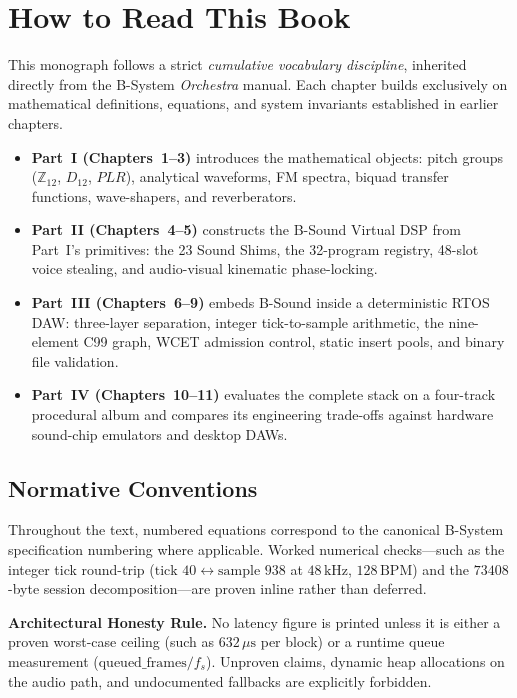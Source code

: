 \chapter{How to Read This Book}

This monograph follows a strict \emph{cumulative vocabulary discipline}, inherited directly from the B-System \emph{Orchestra} manual. Each chapter builds exclusively on mathematical definitions, equations, and system invariants established in earlier chapters.

\begin{itemize}[leftmargin=1.5em]
  \item \textbf{Part~I (Chapters~1--3)} introduces the mathematical objects: pitch groups ($\mathbb{Z}_{12}$, $D_{12}$, $PLR$), analytical waveforms, FM spectra, biquad transfer functions, wave-shapers, and reverberators.
  \item \textbf{Part~II (Chapters~4--5)} constructs the B-Sound Virtual DSP from Part~I's primitives: the 23 Sound Shims, the 32-program registry, 48-slot voice stealing, and audio-visual kinematic phase-locking.
  \item \textbf{Part~III (Chapters~6--9)} embeds B-Sound inside a deterministic RTOS DAW: three-layer separation, integer tick-to-sample arithmetic, the nine-element C99 graph, WCET admission control, static insert pools, and binary file validation.
  \item \textbf{Part~IV (Chapters~10--11)} evaluates the complete stack on a four-track procedural album and compares its engineering trade-offs against hardware sound-chip emulators and desktop DAWs.
\end{itemize}

\section*{Normative Conventions}

Throughout the text, numbered equations correspond to the canonical B-System specification numbering where applicable. Worked numerical checks—such as the integer tick round-trip ($\text{tick } 40 \leftrightarrow \text{sample } 938$ at $48\,\text{kHz}$, $128\,\text{BPM}$) and the $73408$-byte session decomposition—are proven inline rather than deferred.

\begin{spec}
\textbf{Architectural Honesty Rule.} No latency figure is printed unless it is either a proven worst-case ceiling (such as $632\,\mu\text{s}$ per block) or a runtime queue measurement ($\text{queued\_frames}/f_s$). Unproven claims, dynamic heap allocations on the audio path, and undocumented fallbacks are explicitly forbidden.
\end{spec}
